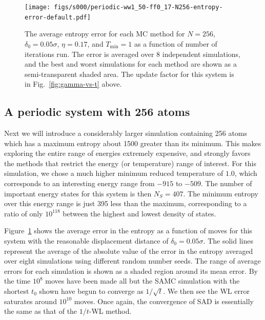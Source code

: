 \documentclass[letterpaper,twocolumn,amsmath,amssymb,pre,aps,10pt]{revtex4-1}
\newcommand{\green}[1]{{\bf \color{green} #1}}
\newcommand{\davidsays}[1]{{\color{red} [\green{David:} \emph{#1}]}}
\begin{document}
\begin{figure}
\texttt{[image: figs/s000/periodic-ww1\_50-ff0\_17-N256-entropy-error-default.pdf]}
  \caption{
  The average entropy error for each MC method for $N=256$,
               $\delta_0 = 0.05\sigma$, $\eta = 0.17$, and $T_{\min} = 1$
               as a function of number of iterations run.  The error is
               averaged over 8 independent simulations, and the best
               and worst simulations for each method are shown as a
               semi-transparent shaded area.  The update factor for this
               system is in Fig.~\ref{fig:gamma-vs-t} above.}\label{fig:n256}
\end{figure}


\subsection{A periodic system with 256 atoms}
Next we will introduce a considerably larger simulation containing 256
atoms which has a maximum entropy about 1500 greater than its minimum.
This makes exploring the entire range of energies extremely expensive,
and strongly favors the methods that restrict the energy (or
temperature) range of interest.  For this simulation, we chose a much
higher minimum reduced temperature of $1.0$, which corresponds to an
interesting energy range from $-915$ to $-509$.  The number of
important energy states for this system is then $N_S = 407$.  The
minimum entropy over this energy range is just 395 less than the
maximum, corresponding to a ratio of only $10^{118}$ between the
highest and lowest density of states.


Figure~\ref{fig:n256} shows the average error in the entropy as a
function of moves for this system with the reasonable displacement
distance of $\delta_0 = 0.05\sigma$.  The solid lines represent the
average of the absolute value of the error in the entropy averaged
over eight simulations using different random number seeds.  The range
of average errors for each simulation is shown as a shaded region
around its mean error.  By the time $10^8$ moves have been made all
but the SAMC simulation with the shortest $t_0$ shown have begun to
converge as $1/\sqrt{t}$.  We then see the WL error saturates around
$10^{10}$ moves.  Once again, the convergence of SAD is essentially
the same as that of the $1/t$-WL method.
\end{document}
